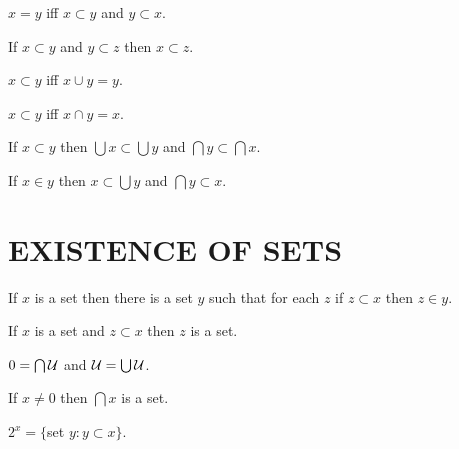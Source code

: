\documentclass[a4paper,draft]{amsproc}
\begin{document}
\begin{forthel}
\begin{theorem}
$x = y$ iff $x \subset y$ and $y \subset x$.
\end{theorem}

\begin{theorem}
If $x \subset y$ and $y \subset z$ then $x \subset z$.
\end{theorem}

\begin{theorem}
$x \subset y$ iff $x \cup y = y$.
\end{theorem}

\begin{theorem}
$x \subset y$ iff $x \cap y = x$.
\end{theorem}

\begin{theorem}
If $x \subset y$ then $\bigcup x \subset \bigcup y$
and $\bigcap y \subset \bigcap x$.
\end{theorem}

\begin{theorem}
If $x \in y$ then $x \subset \bigcup y$ 
and $\bigcap y \subset x$.
\end{theorem}

\section{EXISTENCE OF SETS}

\begin{axiom}
If $x$ is a set then there is a set $y$ such that for each
$z$ if $z \subset x$ then $z \in y$.
\end{axiom}


\begin{theorem}
If $x$ is a set and $z \subset x$ then $z$ is a set.
\end{theorem}

\begin{theorem}
$0 = \bigcap \cal{U}$ and $\cal{U} = \bigcup \cal{U}$.
\end{theorem}

\begin{theorem}
If $x \neq 0$ then $\bigcap x$ is a set.
\end{theorem}

\begin{definition} $2^{x} = \{$set $y : y \subset x\}$.\end{definition}


\end{forthel}
\end{document}
